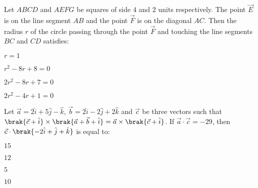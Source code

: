 \item Let $ABCD$ and $AEFG$ be squares of side $4$ and $2$ units respectively. The point $\vec{E}$ is on the line segment $AB$ and the point $\vec{F}$ is on the diagonal $AC$. Then the radius $r$ of the circle passing through the point $\vec{F}$ and touching the line segments $BC$ and $CD$ satisfies:
\begin{enumerate}
\begin{multicols}{4}
\item $r=1$
\item $r^2-8r+8=0$
\item $2r^2-8r+7=0$
\item $2r^2-4r+1=0$
\end{multicols}
\end{enumerate}

\item Let $\vec{a}=2\hat{i}+5\hat{j}-\hat{k}$, $\vec{b}=2\hat{i}-2\hat{j}+2\hat{k}$ and $\vec{c}$ be three vectors such that $\brak{\vec{c}+\hat{i}}\times\brak{\vec{a}+\vec{b}+\hat{i}}=\vec{a}\times\brak{\vec{c}+\hat{i}}$. If $\vec{a}\cdot\vec{c}=-29$, then $\vec{c}\cdot\brak{-2\hat{i}+\hat{j}+\hat{k}}$ is equal to:

\hfill{}
\begin{enumerate}
\begin{multicols}{4}
\item $15$
\item $12$
\item $5$
\item $10$
\end{multicols}
\end{enumerate}
